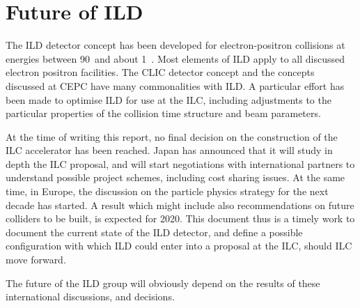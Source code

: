 \chapter{Future of ILD}

The ILD detector concept has been developed for electron-positron collisions at energies between 90~\GeV and about 1~\TeV. Most elements of ILD apply to all discussed electron positron facilities. The CLIC detector concept and the concepts discussed at CEPC have many commonalities with ILD. A particular effort has been made to optimise ILD for use at the ILC, including adjustments to the particular properties of the collision time structure and beam parameters. 

At the time of writing this report, no final decision on the construction of the ILC accelerator has been reached. Japan has announced that it will study in depth the ILC proposal, and will start negotiations with international partners to understand possible project schemes, including cost sharing issues. At the same time, in Europe, the discussion on the particle physics strategy for the next decade has started. A result which might include also recommendations on future colliders to be built, is expected for 2020. This document thus is a timely work to document the current state of the ILD detector, and define a possible configuration with which ILD could enter into a proposal at the ILC, should ILC move forward. 

The future of the ILD group will obviously depend on the results of these international discussions, and decisions. 